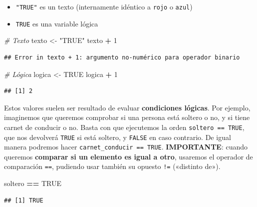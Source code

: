 \documentclass[11pt,]{book}
\newenvironment{Shaded}{\begin{snugshade}}{\end{snugshade}}
\newcommand{\CommentTok}[1]{\textcolor[rgb]{0.37,0.37,0.37}{\textit{#1}}}
\newcommand{\DecValTok}[1]{\textcolor[rgb]{0.06,0.06,0.06}{#1}}
\newcommand{\NormalTok}[1]{#1}
\newcommand{\OperatorTok}[1]{\textcolor[rgb]{0.43,0.43,0.43}{\textbf{#1}}}
\newcommand{\OtherTok}[1]{\textcolor[rgb]{0.37,0.37,0.37}{#1}}
\newcommand{\StringTok}[1]{\textcolor[rgb]{0.5,0.5,0.5}{#1}}
\providecommand{\tightlist}{%
  \setlength{\itemsep}{0pt}\setlength{\parskip}{0pt}}
\begin{document}
\begin{itemize}
\tightlist
\item
  \texttt{"TRUE"} es un texto (internamente idéntico a \texttt{rojo} o \texttt{azul})
\item
  \texttt{TRUE} es una variable lógica
\end{itemize}

\begin{Shaded}
\begin{Highlighting}[]
\CommentTok{# Texto}
\NormalTok{texto <-}\StringTok{ "TRUE"}
\NormalTok{texto }\OperatorTok{+}\StringTok{ }\DecValTok{1}
\end{Highlighting}
\end{Shaded}

\begin{verbatim}
## Error in texto + 1: argumento no-numérico para operador binario
\end{verbatim}

\begin{Shaded}
\begin{Highlighting}[]
\CommentTok{# Lógica}
\NormalTok{logica <-}\StringTok{ }\OtherTok{TRUE}
\NormalTok{logica }\OperatorTok{+}\StringTok{ }\DecValTok{1}
\end{Highlighting}
\end{Shaded}

\begin{verbatim}
## [1] 2
\end{verbatim}

Estos valores suelen ser resultado de evaluar \textbf{condiciones lógicas}. Por ejemplo, imaginemos que queremos comprobar si una persona está soltero o no, y si tiene carnet de conducir o no. Basta con que ejecutemos la orden \texttt{soltero\ ==\ TRUE}, que nos devolverá \texttt{TRUE} si está soltero, y \texttt{FALSE} en caso contrario. De igual manera podremos hacer \texttt{carnet\_conducir\ ==\ TRUE}. \textbf{IMPORTANTE}: cuando queremos \textbf{comparar si un elemento es igual a otro}, usaremos el operador de comparación \texttt{==}, pudiendo usar también su opuesto \texttt{!=} («distinto de»).

\begin{Shaded}
\begin{Highlighting}[]
\NormalTok{soltero }\OperatorTok{==}\StringTok{ }\OtherTok{TRUE}
\end{Highlighting}
\end{Shaded}

\begin{verbatim}
## [1] TRUE
\end{verbatim}
\end{document}

